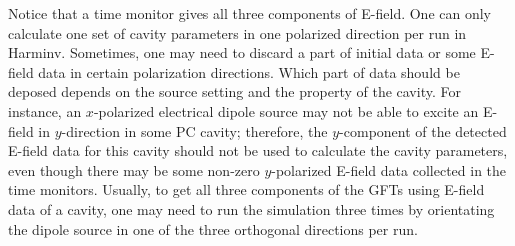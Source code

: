 Notice that a time monitor gives all three components of E-field. One can only calculate one set of cavity parameters in one polarized direction per run in Harminv. Sometimes, one may need to discard a part of initial data or some E-field data in certain polarization directions. Which part of data should be deposed depends on the source setting and the property of the cavity. For instance, an $x$-polarized electrical dipole source may not be able to excite an E-field in $y$-direction in some PC cavity; therefore, the $y$-component of the detected E-field data for this cavity should not be used to calculate the cavity parameters, even though there may be some non-zero $y$-polarized E-field data collected in the time monitors.
Usually, to get all three components of the GFTs using E-field data of a cavity, one may need to run the simulation three times by orientating the dipole source in one of the three orthogonal directions per run.





